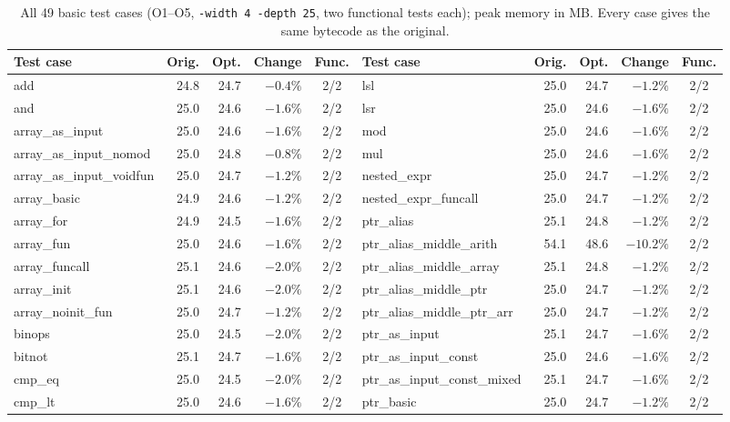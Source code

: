 \documentclass[12pt,a4paper,oneside]{report}
\newcommand{\code}[1]{\texttt{#1}}
\begin{document}
\begin{table}[H]
\centering\scriptsize
\caption{All 49 basic test cases (O1--O5, \code{-width 4 -depth 25}, two functional tests each); peak memory in MB. Every case gives the same bytecode as the original.}
\label{tab:basic}
\setlength{\tabcolsep}{3.5pt}
\begin{tabular}{@{}l r r r c@{\hspace{10pt}}l r r r c@{}}
\toprule
Test case & Orig. & Opt. & Change & Func. & Test case & Orig. & Opt. & Change & Func.\\ \midrule
add & 24.8 & 24.7 & $-0.4\%$ & 2/2 & lsl & 25.0 & 24.7 & $-1.2\%$ & 2/2\\
and & 25.0 & 24.6 & $-1.6\%$ & 2/2 & lsr & 25.0 & 24.6 & $-1.6\%$ & 2/2\\
array\_as\_input & 25.0 & 24.6 & $-1.6\%$ & 2/2 & mod & 25.0 & 24.6 & $-1.6\%$ & 2/2\\
array\_as\_input\_nomod & 25.0 & 24.8 & $-0.8\%$ & 2/2 & mul & 25.0 & 24.6 & $-1.6\%$ & 2/2\\
array\_as\_input\_voidfun & 25.0 & 24.7 & $-1.2\%$ & 2/2 & nested\_expr & 25.0 & 24.7 & $-1.2\%$ & 2/2\\
array\_basic & 24.9 & 24.6 & $-1.2\%$ & 2/2 & nested\_expr\_funcall & 25.0 & 24.7 & $-1.2\%$ & 2/2\\
array\_for & 24.9 & 24.5 & $-1.6\%$ & 2/2 & ptr\_alias & 25.1 & 24.8 & $-1.2\%$ & 2/2\\
array\_fun & 25.0 & 24.6 & $-1.6\%$ & 2/2 & ptr\_alias\_middle\_arith & 54.1 & 48.6 & $-10.2\%$ & 2/2\\
array\_funcall & 25.1 & 24.6 & $-2.0\%$ & 2/2 & ptr\_alias\_middle\_array & 25.1 & 24.8 & $-1.2\%$ & 2/2\\
array\_init & 25.1 & 24.6 & $-2.0\%$ & 2/2 & ptr\_alias\_middle\_ptr & 25.0 & 24.7 & $-1.2\%$ & 2/2\\
array\_noinit\_fun & 25.0 & 24.7 & $-1.2\%$ & 2/2 & ptr\_alias\_middle\_ptr\_arr & 25.0 & 24.7 & $-1.2\%$ & 2/2\\
binops & 25.0 & 24.5 & $-2.0\%$ & 2/2 & ptr\_as\_input & 25.1 & 24.7 & $-1.6\%$ & 2/2\\
bitnot & 25.1 & 24.7 & $-1.6\%$ & 2/2 & ptr\_as\_input\_const & 25.0 & 24.6 & $-1.6\%$ & 2/2\\
cmp\_eq & 25.0 & 24.5 & $-2.0\%$ & 2/2 & ptr\_as\_input\_const\_mixed & 25.1 & 24.7 & $-1.6\%$ & 2/2\\
cmp\_lt & 25.0 & 24.6 & $-1.6\%$ & 2/2 & ptr\_basic & 25.0 & 24.7 & $-1.2\%$ & 2/2\\

\end{tabular}
\end{table}
\end{document}
